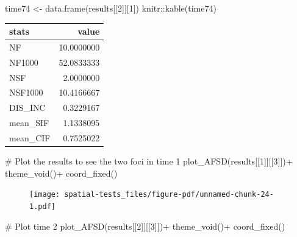 \documentclass[
  letterpaper,
]{book}
\newenvironment{Shaded}{\begin{snugshade}}{\end{snugshade}}
\newcommand{\CommentTok}[1]{\textcolor[rgb]{0.37,0.37,0.37}{#1}}
\newcommand{\DecValTok}[1]{\textcolor[rgb]{0.68,0.00,0.00}{#1}}
\newcommand{\FunctionTok}[1]{\textcolor[rgb]{0.28,0.35,0.67}{#1}}
\newcommand{\NormalTok}[1]{\textcolor[rgb]{0.00,0.23,0.31}{#1}}
\newcommand{\OtherTok}[1]{\textcolor[rgb]{0.00,0.23,0.31}{#1}}
\newcommand{\SpecialCharTok}[1]{\textcolor[rgb]{0.37,0.37,0.37}{#1}}
\begin{document}
\begin{Shaded}
\begin{Highlighting}[]
\NormalTok{time74 }\OtherTok{\textless{}{-}} \FunctionTok{data.frame}\NormalTok{(results[[}\DecValTok{2}\NormalTok{]][}\DecValTok{1}\NormalTok{])}
\NormalTok{knitr}\SpecialCharTok{::}\FunctionTok{kable}\NormalTok{(time74)}
\end{Highlighting}
\end{Shaded}

\begin{longtable}[]{@{}lr@{}}
\toprule\noalign{}
stats & value \\
\midrule\noalign{}
\endhead
\bottomrule\noalign{}
\endlastfoot
NF & 10.0000000 \\
NF1000 & 52.0833333 \\
NSF & 2.0000000 \\
NSF1000 & 10.4166667 \\
DIS\_INC & 0.3229167 \\
mean\_SIF & 1.1338095 \\
mean\_CIF & 0.7525022 \\
\end{longtable}

\begin{Shaded}
\begin{Highlighting}[]
\CommentTok{\# Plot the results to see the two foci in time 1}
\FunctionTok{plot\_AFSD}\NormalTok{(results[[}\DecValTok{1}\NormalTok{]][[}\DecValTok{3}\NormalTok{]])}\SpecialCharTok{+}
  \FunctionTok{theme\_void}\NormalTok{()}\SpecialCharTok{+}
  \FunctionTok{coord\_fixed}\NormalTok{()}
\end{Highlighting}
\end{Shaded}

\begin{figure}[H]

{\centering \texttt{[image: spatial-tests\_files/figure-pdf/unnamed-chunk-24-1.pdf]}

}

\end{figure}

\begin{Shaded}
\begin{Highlighting}[]
\CommentTok{\# Plot time 2}
\FunctionTok{plot\_AFSD}\NormalTok{(results[[}\DecValTok{2}\NormalTok{]][[}\DecValTok{3}\NormalTok{]])}\SpecialCharTok{+}
  \FunctionTok{theme\_void}\NormalTok{()}\SpecialCharTok{+}
  \FunctionTok{coord\_fixed}\NormalTok{()}
\end{Highlighting}
\end{Shaded}
\end{document}
